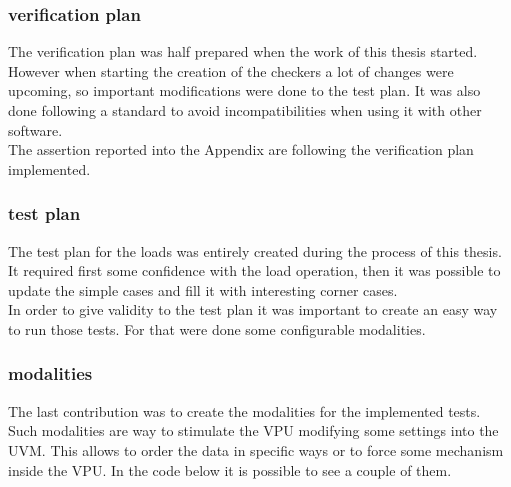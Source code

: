 \subsubsection{verification plan}
The verification plan was half prepared when the work of this thesis started. However when starting the creation of the checkers a lot of changes were upcoming, so important modifications were done to the test plan. It was also done following a standard to avoid incompatibilities when using it with other software.\\
The assertion reported into the Appendix are following the verification plan implemented.\\

\subsubsection{test plan}
The test plan for the loads was entirely created during the process of this thesis. It required first some confidence with the load operation, then it was possible to update the simple cases and fill it with interesting corner cases.\\

In order to give validity to the test plan it was important to create an easy way to run those tests. For that were done some configurable modalities.\\


\subsubsection{modalities}
The last contribution was to create the modalities for the implemented tests. Such modalities are way to stimulate the VPU modifying some settings into the UVM. This allows to order the data in specific ways or to force some mechanism inside the VPU. In the code below it is possible to see a couple of them.\\

